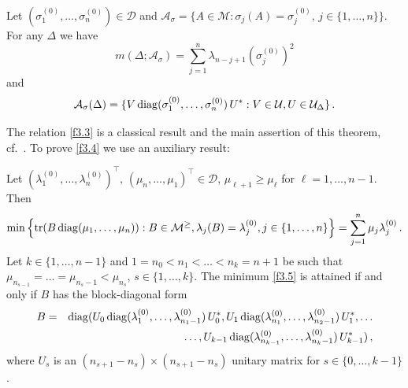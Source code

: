 \documentclass{amsart}
\begin{document}
\begin{thm} \label{t3.2}
    Let $(\sigma_1^{(0)}, \ldots , \sigma_n^{(0)}) \in {\mathcal D}$ and ${\mathcal A}_\sigma = \{ A \in {\mathcal M} : \sigma_j(A)=\sigma_j^{(0)}, \, j \in \{ 1,\ldots,n\} \}$. For any $\Delta$ we have
\begin{equation} \label{f3.3}
    m(\Delta;{\mathcal A}_\sigma) = \sum_{j=1}^n \lambda_{n-j+1}(\sigma_j^{(0)})^2
\end{equation}
and
\begin{equation} \label{f3.4}
    {\mathcal A}_\sigma (\Delta) = \{  V \, {\rm diag}(\sigma_1^{(0)}, \ldots , \sigma_n^{(0)}) \, U^* : V \in {\mathcal U}, U \in {\mathcal U}_\Delta \} \, .
\end{equation}
\end{thm}

The relation \eqref{f3.3} is a classical result and the main assertion of this theorem, cf.~\cite[Thm.~20.A.2]{MOA}. To prove \eqref{f3.4} we use an auxiliary result:

\begin{lem} \label{l3.3}
   Let $(\lambda_1^{(0)}, \ldots ,\lambda_n^{(0)})^\top, \, ({\mu_n}, \ldots ,{\mu_1})^\top \in{\mathcal D}$, $\mu_{\ell+1} \geq \mu_\ell$ for $\ell = 1, \ldots , n-1$. Then 
\begin{equation} \label{f3.5}
       \min  \left\{ {\rm tr}(B \, {\rm diag}(\mu_1,\ldots,\mu_n)) : B \in {\mathcal M}^\geq, \lambda_j(B)=\lambda_j^{(0)} , j \in \{ 1,\ldots,n\}\right\} = \sum_{j=1}^n \mu_j\lambda_j^{(0)} \, .
\end{equation}   
Let $k \in \{1, \ldots , n-1\}$ and $1=n_0 <n_1<\ldots<n_k=n+1$ be such that $\mu_{n_{s-1}} = \ldots = \mu_{n_s - 1} < \mu_{n_s}$, $s \in \{1,\ldots,k\}$. The minimum \eqref{f3.5} is attained if and only if $B$ has the block-diagonal form 
\begin{eqnarray} \label{f3.6}
   B & = & {\rm diag}(U_0 \, {\rm diag}(\lambda_1^{(0)}, \ldots ,\lambda_{n_1-1}^{(0)}) \, U_0^*, U_1 \, {\rm diag}(\lambda_{n_1}^{(0)}, \ldots , \lambda_{n_2-1}^{(0)}) \, U_1^*,  \ldots \\ 
      &    & \ldots , U_{k-1} \, {\rm diag}(\lambda_{n_{k-1}}^{(0)}, \ldots ,\lambda_{n_k-1}^{(0)}) \, U_{k-1}^*) \, , \nonumber
\end{eqnarray}
where $U_s$ is an $(n_{s+1}-n_s) \times (n_{s+1}-n_s)$ unitary matrix for $s \in \{ 0,\ldots,k-1\}$. 
\end{lem}
\end{document}
